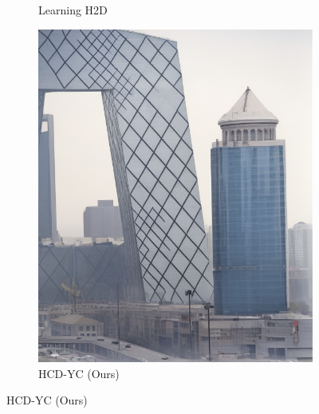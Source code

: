 \documentclass{article}
\begin{document}
\begin{figure}[t]
\begin{subfigure}[b]{0.32\textwidth}
    \caption{Learning H2D}
\end{subfigure}
\hfill
\begin{subfigure}[b]{0.32\textwidth}
    \centering
    \includegraphics[width=\textwidth]{examples_ours/2_isr_adaptive.png}
    \caption{HCD-YC (Ours)}
\end{subfigure}


\end{figure}
\end{document}
